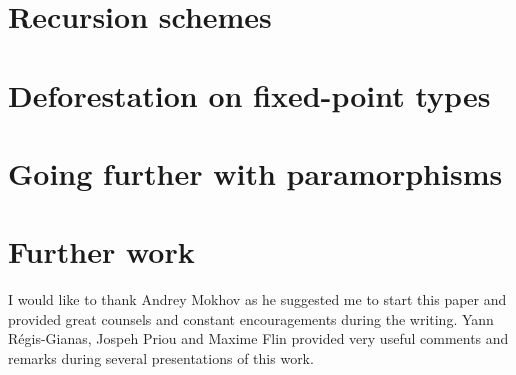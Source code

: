 \documentclass[format=sigplan, review=true, anonymous=true]{acmart}
\begin{document}
\section{Recursion schemes}
\label{sec:recschemes}


\section{Deforestation on fixed-point types}
\label{sec:rectypes}


\section{Going further with paramorphisms}
\label{sec:para}


\section{Further work}
\label{sec:related}


\begin{acks}
I would like to thank Andrey Mokhov as he suggested me to start this paper and provided great counsels and constant encouragements during the writing. Yann Régis-Gianas, Jospeh Priou and Maxime Flin provided very useful comments and remarks during several presentations of this work.
\end{acks}



\end{document}
